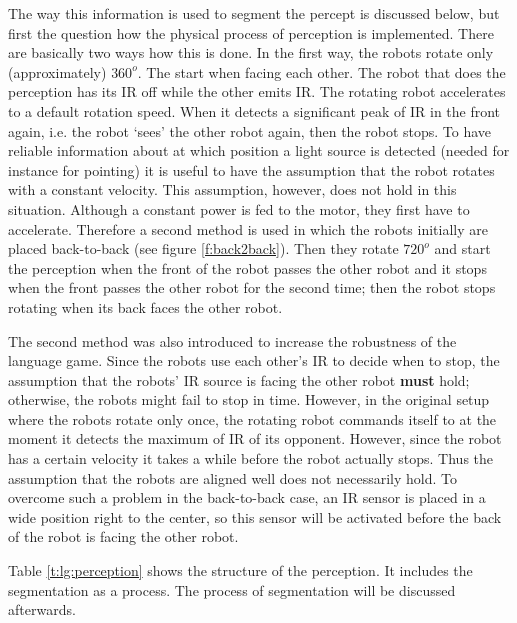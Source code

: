 The way this information is used to segment the percept is discussed below, but first the question how the physical process of perception is implemented. There are basically two  ways how this is done. In the first way, the robots rotate only (approximately) $360^o$. The start when facing each other. The robot that does the perception has its IR off while the other emits IR. The rotating robot accelerates to a default rotation speed. When it detects a significant peak of IR in the front again, i.e. the robot `sees' the other robot again, then the robot stops. To have reliable information about at which position a light source is detected (needed for instance for pointing) it is useful to have the assumption that the robot rotates with a constant velocity. This assumption, however, does not hold in this situation. Although a constant power is fed to the motor, they first have to accelerate. Therefore a second method is used in which the robots initially are placed back-to-back (see figure \ref{f:back2back}). Then they rotate $720^o$ and start the perception when the front of the robot passes the other robot and it stops when the front passes the other robot for the second time; then the robot stops rotating when its back faces the other robot.

The second method was also introduced to increase the robustness of the language game. Since the robots use each other's IR to decide when to stop, the assumption that the robots' IR source is facing the other robot {\bf must} hold; otherwise, the robots might fail to stop in time. However, in the original setup where the robots rotate only once, the rotating robot commands itself to at the moment it detects the maximum of IR of its opponent. However, since the robot has a certain velocity it takes a while before the robot actually stops. Thus the assumption that the robots are aligned well does not necessarily hold. To overcome such a problem in the back-to-back case, an IR sensor is placed in a wide position right to the center, so this sensor will be activated before the back of the robot is facing the other robot.

 Table \ref{t:lg:perception} shows the structure of the perception. It includes the segmentation as a process. The process of segmentation will be discussed afterwards.

